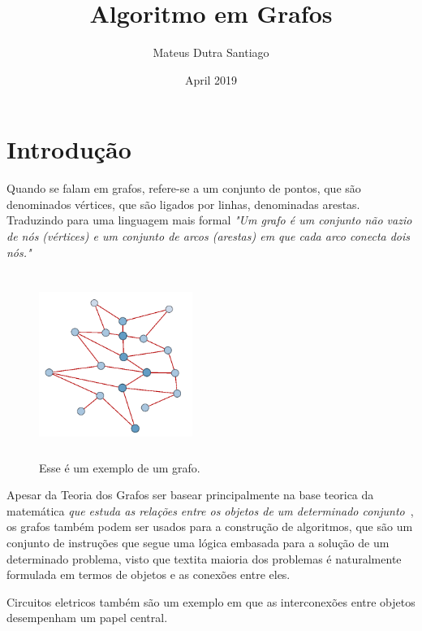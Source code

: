 \documentclass[a4paper, 10pt]{article}
\title{ Algoritmo em Grafos}
\author{Mateus Dutra Santiago}
\date{April 2019}
\begin{document}
\maketitle

\section{Introdução}
\quad Quando se falam em grafos, refere-se a um conjunto de pontos, que são denominados vértices, que são ligados por linhas, denominadas arestas. Traduzindo para uma linguagem mais formal \textit{"Um grafo é um conjunto não vazio de nós (vértices) e um conjunto de arcos (arestas) em que
cada arco conecta dois nós."~\cite{J}}
\begin{figure}[!htb]
    \center
    \includegraphics[width=5cm, height=6cm, angle=0]{grafo03.png}
    \caption{\label{fig:my-label} Esse é um exemplo de um grafo.}
\end{figure}

\quad Apesar da Teoria dos Grafos ser basear principalmente na base teorica da matemática \textit{que estuda as relações entre os objetos de um determinado conjunto}~\cite{tg}, os grafos também podem ser usados para a construção de algoritmos, que são um conjunto de instruções que segue uma lógica embasada para a solução de um determinado problema, visto que textit{a maioria dos problemas é naturalmente formulada em termos de objetos e as conexões entre eles.}~\cite{RS}

\quad Circuitos eletricos também são um exemplo em que as interconexões entre objetos desempenham um papel central.
\end{document}
